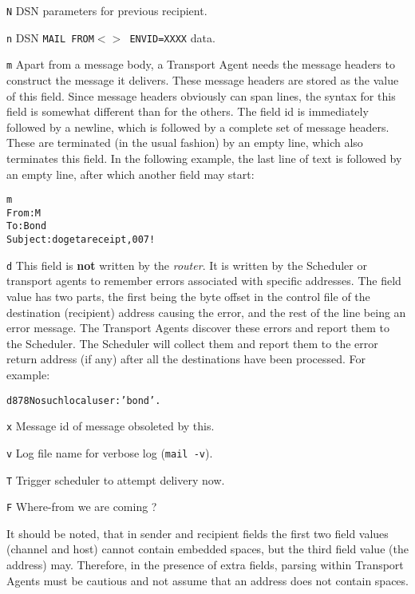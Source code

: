 {\tt N}
DSN parameters for previous recipient.

{\tt n}
DSN {\tt MAIL FROM{\(<>\)} ENVID=XXXX} data.

{\tt m}     
Apart from a message body, a Transport Agent needs the message headers
to construct the message it delivers.  These message headers are
stored as the value of this field.  Since message headers obviously
can span lines, the syntax for this field is somewhat different than
for the others.  The field id is immediately followed by a newline,
which is followed by a complete set of message headers.  These are
terminated (in the usual fashion) by an empty line, which also
terminates this field.  In the following example, the last line of
text is followed by an empty line, after which another field may
start:

\begin{alltt}
          m
          From: M
          To: Bond
          Subject: do get a receipt, 007!
\end{alltt}


{\tt d}     
This field is {\bf not} written by the {\em router}.  It is written by the
Scheduler or transport agents to remember errors associated with specific addresses. The
field value has two parts, the first being the byte offset in the
control file of the destination (recipient) address causing the error,
and the rest of the line being an error message.  The Transport Agents
discover these errors and report them to the Scheduler.  The Scheduler
will collect them and report them to the error return address (if any)
after all the destinations have been processed.
For example:
\begin{alltt}
          d 878 No such local user: 'bond'.
\end{alltt}
     

{\tt x}
Message id of message obsoleted by this.

{\tt v}
Log file name for verbose log ({\tt mail -v}).

{\tt T}
Trigger scheduler to attempt delivery now.

{\tt F}
Where-from we are coming ?               

It should be noted, that in sender and recipient fields the first two field
values (channel and host) cannot contain embedded spaces, but the third
field value (the address) may.  Therefore, in the presence of extra fields,
parsing within Transport Agents must be cautious and not assume that an
address does not contain spaces.

